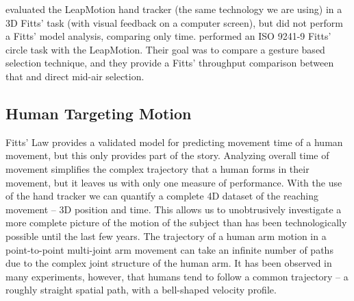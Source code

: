\citet{coelho_pointing_2014} evaluated the LeapMotion hand tracker (the same technology we are using) in a 3D Fitts' task (with visual feedback on a computer screen), but did not perform a Fitts' model analysis, comparing only time.
\citet{seixas_one_2015} performed an ISO 9241-9 Fitts' circle task with the LeapMotion.
Their goal was to compare a gesture based selection technique, and they provide a Fitts' throughput comparison between that and direct mid-air selection.

\subsection{Human Targeting Motion}
\label{human-targeting-motion}
%
%
Fitts' Law provides a validated model for predicting movement time of a human movement, but this only provides part of the story.
Analyzing overall time of movement simplifies the complex trajectory that a human forms in their movement, but it leaves us with only one measure of performance.
With the use of the hand tracker we can quantify a complete 4D dataset of the reaching movement -- 3D position and time.
This allows us to unobtrusively investigate a more complete picture of the motion of the subject than has been technologically possible until the last few years.
The trajectory of a human arm motion in a point-to-point multi-joint arm movement can take an infinite number of paths due to the complex joint structure of the human arm.
It has been observed in many experiments, however, that humans tend to follow a common trajectory -- a roughly straight spatial path, with a bell-shaped velocity profile.
%
%
